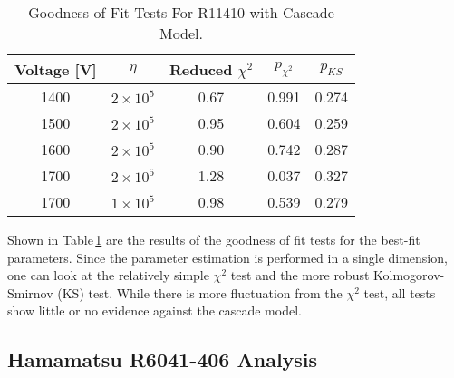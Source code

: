 \documentclass[11pt,a4paper]{article}
\newcommand\tabref[1]{Table\,\ref{#1}}
\begin{document}
\begin{table}
\centering
\caption{Goodness of Fit Tests For R11410 with Cascade Model.}
\label{tab-gof}
\begin{tabular}{|c|c|c|c|c|}
\hline
Voltage {[}V{]} & $\eta$ & Reduced $\chi^2$ & $p_{\chi^2}$ & $p_{KS}$  \\ \hline
1400 & $2 \times 10^5$ & 0.67 & 0.991 & 0.274 \\ \hline
1500 & $2 \times 10^5$ & 0.95 & 0.604 & 0.259 \\ \hline
1600 & $2 \times 10^5$ & 0.90 & 0.742 & 0.287 \\ \hline
1700 & $2 \times 10^5$ & 1.28 & 0.037 & 0.327 \\ \hline
1700 & $1 \times 10^5$ & 0.98 & 0.539 & 0.279 \\ \hline

\end{tabular}
\end{table}

Shown in \tabref{tab-gof} are the results of the goodness of fit tests for the best-fit parameters.  Since the parameter estimation is performed in a single dimension, one can look at the relatively simple $\chi^2$ test and the more robust Kolmogorov-Smirnov (KS) test.  While there is more fluctuation from the $\chi^2$ test, all tests show little or no evidence against the cascade model.



\subsection{\label{sec:level3-2}Hamamatsu R6041-406 Analysis}
\end{document}
